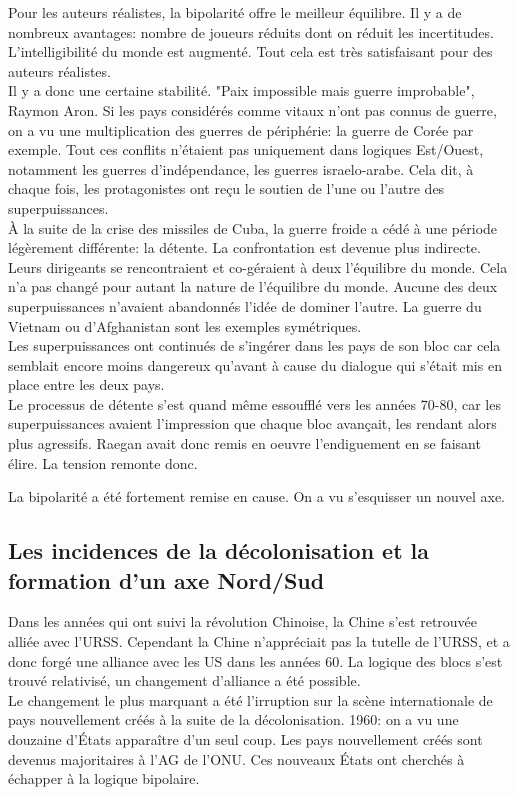 \documentclass[10pt, a4paper, openany]{book}
\begin{document}
Pour les auteurs réalistes, la bipolarité offre le meilleur équilibre. Il y a de nombreux avantages: nombre de joueurs réduits dont on réduit les incertitudes. L'intelligibilité du monde est augmenté. Tout cela est très satisfaisant pour des auteurs réalistes. \\
Il y a donc une certaine stabilité. "Paix impossible mais guerre improbable", Raymon Aron. Si les pays considérés comme vitaux n'ont pas connus de guerre, on a vu une multiplication des guerres de périphérie: la guerre de Corée par exemple. Tout ces conflits n'étaient pas uniquement dans logiques Est/Ouest, notamment les guerres d'indépendance, les guerres israelo-arabe. Cela dit, à chaque fois, les protagonistes ont reçu le soutien de l'une ou l'autre des superpuissances. \\
À la suite de la crise des missiles de Cuba, la guerre froide a cédé à une période légèrement différente: la détente. La confrontation est devenue plus indirecte. Leurs dirigeants se rencontraient et co-géraient à deux l'équilibre du monde. Cela n'a pas changé pour autant la nature de l'équilibre du monde. Aucune des deux superpuissances n'avaient abandonnés l'idée de dominer l'autre. La guerre du Vietnam ou d'Afghanistan sont les exemples symétriques. \\
Les superpuissances ont continués de s'ingérer dans les pays de son bloc car cela semblait encore moins dangereux qu'avant à cause du dialogue qui s'était mis en place entre les deux pays. \\
Le processus de détente s'est quand même essoufflé vers les années 70-80, car les superpuissances avaient l'impression que chaque bloc avançait, les rendant alors plus agressifs. Raegan avait donc remis en oeuvre l'endiguement en se faisant élire. La tension remonte donc.


La bipolarité a été fortement remise en cause. On a vu s'esquisser un nouvel axe. 

\subsection{Les incidences de la décolonisation et la formation d'un axe Nord/Sud}

Dans les années qui ont suivi la révolution Chinoise, la Chine s'est retrouvée alliée avec l'URSS. Cependant la Chine n'appréciait pas la tutelle de l'URSS, et a donc forgé une alliance avec les US dans les années 60. La logique des blocs s'est trouvé relativisé, un changement d'alliance a été possible. \\
Le changement le plus marquant a été l'irruption sur la scène internationale de pays nouvellement créés à la suite de la décolonisation. 1960: on a vu une douzaine d'États apparaître d'un seul coup. Les pays nouvellement créés sont devenus majoritaires à l'AG de l'ONU. Ces nouveaux États ont cherchés à échapper à la logique bipolaire. 
\end{document}
